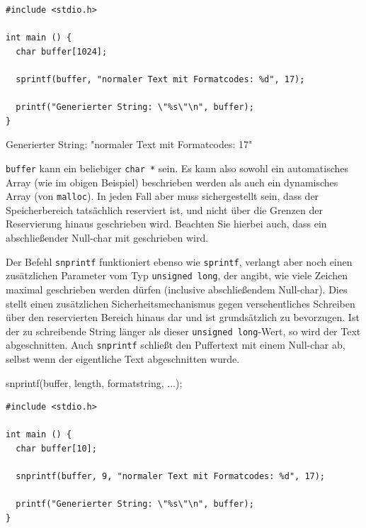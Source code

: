 \begin{codebox}
\begin{verbatim}
#include <stdio.h>

int main () {
  char buffer[1024];

  sprintf(buffer, "normaler Text mit Formatcodes: %d", 17);

  printf("Generierter String: \"%s\"\n", buffer);
}
\end{verbatim}
\end{codebox}

\begin{cmdbox}
Generierter String: "normaler Text mit Formatcodes: 17"
\end{cmdbox}

\texttt{buffer} kann ein beliebiger \texttt{char *} sein. Es kann also sowohl ein automatisches Array (wie im obigen Beispiel) beschrieben werden als auch ein dynamisches Array (von \texttt{malloc}). In jeden Fall aber muss sichergestellt sein, dass der Speicherbereich tatsächlich reserviert ist, und nicht über die Grenzen der Reservierung hinaus geschrieben wird. Beachten Sie hierbei auch, dass ein abschließender Null-char mit geschrieben wird.

Der Befehl \texttt{snprintf} funktioniert ebenso wie \texttt{sprintf}, verlangt aber noch einen zusätzlichen Parameter vom Typ \texttt{unsigned long}, der angibt, wie viele Zeichen maximal geschrieben werden dürfen (inclusive abschließendem Null-char). Dies stellt einen zusätzlichen Sicherheitsmechanismus gegen versehentliches Schreiben über den reservierten Bereich hinaus dar und ist grundsätzlich zu bevorzugen. Ist der zu schreibende String länger als dieser \texttt{unsigned long}-Wert, so wird der Text abgeschnitten. Auch \texttt{snprintf} schließt den Puffertext mit einem Null-char ab, selbst wenn der eigentliche Text abgeschnitten wurde.

\begin{codebox}
snprintf(buffer, length, formatstring, ...);
\end{codebox}

\begin{codebox}
\begin{verbatim}
#include <stdio.h>

int main () {
  char buffer[10];

  snprintf(buffer, 9, "normaler Text mit Formatcodes: %d", 17);

  printf("Generierter String: \"%s\"\n", buffer);
}
\end{verbatim}
\end{codebox}

